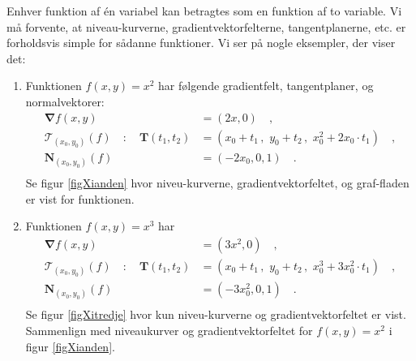 \begin{example}
Enhver funktion af \'{e}n variabel kan betragtes som en funktion af to variable. Vi må forvente, at niveau-kurverne, gradientvektorfelterne, tangentplanerne, etc. er forholdsvis simple for sådanne funktioner. Vi ser på nogle eksempler, der viser det:
\begin{enumerate}
\item Funktionen $f(x,y) = x^{2}$ har følgende gradientfelt, tangentplaner, og normalvektorer:
\begin{equation}
\begin{aligned}
{\bm{\nabla}}f(x,y) &= (2x, 0) \quad ,\\
\mathcal{T}_{(x_{0}, y_{0})}(f) \quad : \quad \mathbf{T}(t_{1}, t_{2}) &= (x_{0} + t_{1}\, , \,\, y_{0} + t_{2}\, , \,\, x_{0}^{2} + 2x_{0}\cdot t_{1}) \quad ,\\
\mathbf{N}_{(x_{0}, y_{0})}(f) &= (-2x_{0}, 0, 1) \quad .\\
\end{aligned}
\end{equation}
 Se figur \ref{figXianden} hvor niveu-kurverne, gradientvektorfeltet, og graf-fladen er vist for funktionen.

 \item Funktionen $f(x,y) = x^{3}$ har
\begin{equation}
\begin{aligned}
{\bm{\nabla}}f(x,y) &= (3x^{2}, 0) \quad ,\\
\mathcal{T}_{(x_{0}, y_{0})}(f) \quad :  \quad \mathbf{T}(t_{1}, t_{2}) &= (x_{0} + t_{1}\, , \,\, y_{0} +  t_{2} \, , \,\, x_{0}^{3} + 3x_{0}^{2}\cdot t_{1}) \quad ,\\
\mathbf{N}_{(x_{0}, y_{0})}(f) &= (-3x_{0}^{2}, 0 , 1) \quad .\\
\end{aligned}
\end{equation}
 Se figur \ref{figXitredje} hvor kun niveu-kurverne og gradientvektorfeltet er vist. Sammenlign med niveaukurver og gradientvektorfeltet for $f(x,y) = x^{2}$ i figur \ref{figXianden}.



\end{enumerate}
\end{example}
